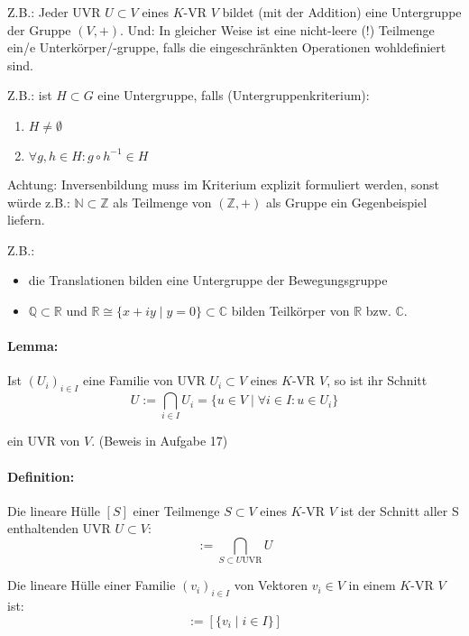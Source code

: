 	Z.B.: Jeder UVR $U\subset V$ eines $K$-VR $V$ bildet (mit der Addition) eine Untergruppe der Gruppe $(V,+)$.
    Und: In gleicher Weise ist eine nicht-leere (!) Teilmenge ein/e Unterkörper/-gruppe, falls die eingeschränkten Operationen wohldefiniert sind.
    
    Z.B.: ist $H\subset G$ eine Untergruppe, falls (Untergruppenkriterium):
    \begin{enumerate}
        \item $H\neq \emptyset$
        \item $\forall g,h\in H: g\circ h^{-1} \in H$
    \end{enumerate}
            
	Achtung: Inversenbildung muss im Kriterium explizit formuliert werden, sonst würde z.B.: $\mathbb{N}\subset\mathbb{Z}$ als Teilmenge von $(\mathbb{Z}, +)$ als Gruppe ein Gegenbeispiel liefern.
            
     Z.B.: 
     \begin{itemize}
        \item die Translationen bilden eine Untergruppe der Bewegungsgruppe
        \item $\mathbb{Q}\subset\mathbb{R}$ und $\mathbb{R}\cong \{x+iy\mid y=0\}\subset\mathbb{C}$ bilden Teilkörper von $\mathbb{R}$ bzw. $\mathbb{C}$.
     \end{itemize}

\paragraph{Lemma:}
    Ist $(U_i)_{i\in I}$ eine Familie von UVR $U_i\subset V$ eines $K$-VR $V$, so ist ihr Schnitt
    \begin{equation*}
        U:= \bigcap_{i\in I}U_i =\{ u\in V\mid \forall i\in I: u\in U_i\}
    \end{equation*}
        
    ein UVR von $V$. (Beweis in Aufgabe 17)
    
\paragraph{Definition:}
	Die lineare Hülle $[S]$ einer Teilmenge $S\subset V$ eines $ K $-VR $ V $ ist der Schnitt aller S enthaltenden UVR $U\subset V$:
	\begin{equation*}
		[S] := \bigcap_{S\subset U \text{UVR}} U
	\end{equation*}

	Die lineare Hülle einer Familie $(v_i)_{i\in I}$ von Vektoren $v_i\in V$ in einem $ K $-VR $ V $ ist:
        \begin{equation*}
        	[(v_i)_{i\in I}] := [\{v_i\mid i\in I\}]
        \end{equation*}


